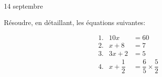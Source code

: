 \documentclass{beamer}
\renewcommand{\date}{14 septembre}
\begin{document}
\begin{frame}
	{\small\date}

	Résoudre, en détaillant, les équations suivantes:

	\begin{center}
		\begin{align*}
			 & 1. & 10x              & = 60                          \\
			 & 2. & x + 8            & = 7                           \\
			 & 3. & 3x +2            & = 5                           \\
			 & 4. & x + \dfrac{1}{2} & = \dfrac{6}{5} × \dfrac{5}{2} \\
		\end{align*}
	\end{center}
\end{frame}
\end{document}
